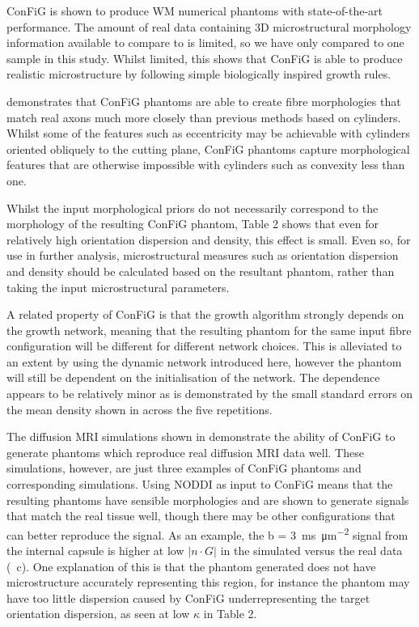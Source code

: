 ConFiG is shown to produce WM numerical phantoms with state-of-the-art performance. The amount of real data containing 3D microstructural morphology information available to compare to is limited, so we have only compared to one sample in this study. Whilst limited, this shows that ConFiG is able to produce realistic microstructure by following simple biologically inspired growth rules.

 demonstrates that ConFiG phantoms are able to create fibre morphologies that match real axons much more closely than previous methods based on cylinders. Whilst some of the features such as eccentricity may be achievable with cylinders oriented obliquely to the cutting plane, ConFiG phantoms capture morphological features that are otherwise impossible with cylinders such as convexity less than one.

Whilst the input morphological priors do not necessarily correspond to the morphology of the resulting ConFiG phantom, Table 2 shows that even for relatively high orientation dispersion and density, this effect is small. Even so, for use in further analysis, microstructural measures such as orientation dispersion and density should be calculated based on the resultant phantom, rather than taking the input microstructural parameters.

A related property of ConFiG is that the growth algorithm strongly depends on the growth network, meaning that the resulting phantom for the same input fibre configuration will be different for different network choices. This is alleviated to an extent by using the dynamic network introduced here, however the phantom will still be dependent on the initialisation of the network. The dependence appears to be relatively minor as is demonstrated by the small standard errors on the mean density shown in  across the five repetitions.

The diffusion MRI simulations shown in  demonstrate the ability of ConFiG to generate phantoms which reproduce real diffusion MRI data well. These simulations, however, are just three examples of ConFiG phantoms and corresponding simulations. Using NODDI as input to ConFiG means that the resulting phantoms have sensible morphologies and are shown to generate signals that match the real tissue well, though there may be other configurations that can better reproduce the signal. As an example, the b = \SI{3}{\milli\second\per\micro\metre\squared} signal from the internal capsule is higher at low $|n\cdot G|$ in the simulated versus the real data (~c). One explanation of this is that the phantom generated does not have microstructure accurately representing this region, for instance the phantom may have too little dispersion caused by ConFiG underrepresenting the target orientation dispersion, as seen at low $\kappa$ in Table 2.

